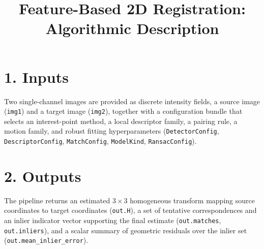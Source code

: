 \documentclass[11pt]{article}
\title{Feature-Based 2D Registration: Algorithmic Description}
\author{}
\date{}
\begin{document}
\maketitle

\section*{1. Inputs}
Two single-channel images are provided as discrete intensity fields, a source image (\texttt{img1}) and a target image (\texttt{img2}), together with a configuration bundle that selects an interest-point method, a local descriptor family, a pairing rule, a motion family, and robust fitting hyperparameters (\texttt{DetectorConfig}, \texttt{DescriptorConfig}, \texttt{MatchConfig}, \texttt{ModelKind}, \texttt{RansacConfig}).

\section*{2. Outputs}
The pipeline returns an estimated $3\times 3$ homogeneous transform mapping source coordinates to target coordinates (\texttt{out.H}), a set of tentative correspondences and an inlier indicator vector supporting the final estimate (\texttt{out.matches}, \texttt{out.inliers}), and a scalar summary of geometric residuals over the inlier set (\texttt{out.mean\_inlier\_error}).
\end{document}

